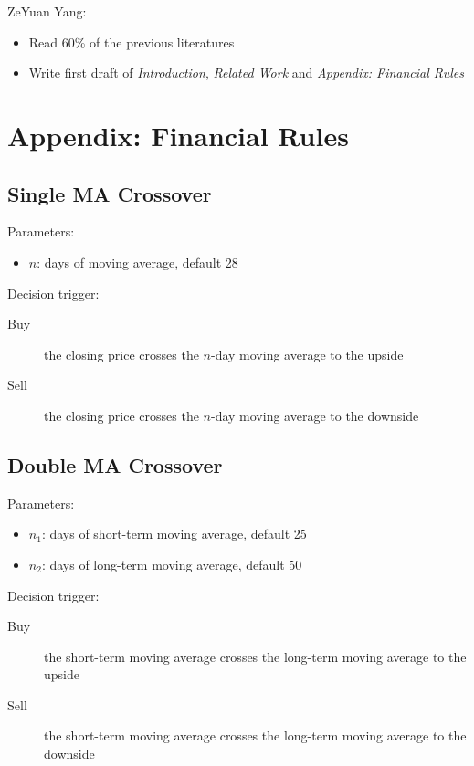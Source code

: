 \documentclass{article}
\begin{document}
\noindent
ZeYuan Yang:

\begin{itemize}
    \item Read 60\% of the previous literatures
    \item Write first draft of \textit{Introduction}, \textit{Related Work} and \textit{Appendix: Financial Rules}
\end{itemize}





\section{Appendix: Financial Rules}\label{section-appendix-financial-rules}


\subsection{Single MA Crossover}

\setlength{\parindent}{0pt}

Parameters\cite{genetic-algorithms-for-predicting-the-egyptian-stock-market}:
\begin{itemize}
    \item $n$: days of moving average, default 28
\end{itemize}

Decision trigger:
\begin{description}
    \item[Buy] the closing price crosses the $n$-day moving average to the upside
    \item[Sell] the closing price crosses the $n$-day moving average to the downside
\end{description}

\subsection{Double MA Crossover}

Parameters\cite{genetic-algorithms-for-predicting-the-egyptian-stock-market}:
\begin{itemize}
    \item $n_1$: days of short-term moving average, default 25
    \item $n_2$: days of long-term moving average, default 50
\end{itemize}

Decision trigger:
\begin{description}
    \item[Buy] the short-term moving average crosses the long-term moving average to the upside
    \item[Sell] the short-term moving average crosses the long-term moving average to the downside
\end{description}
\end{document}
